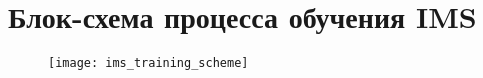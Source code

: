 \chapter{Блок-схема процесса обучения IMS}
\label{app:IMS:TrainingScheme}
\begin{figure}[H]
\texttt{[image: ims\_training\_scheme]}
\end{figure}